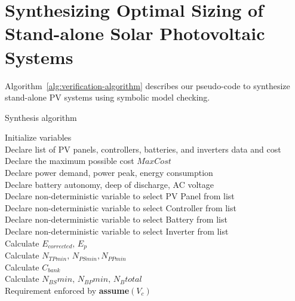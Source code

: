 \documentclass[10pt,conference]{IEEEtran}
\begin{document}
\section{Synthesizing Optimal Sizing of Stand-alone Solar Photovoltaic Systems}
Algorithm~\ref{alg:verification-algorithm} describes our pseudo-code to synthesize stand-alone PV systems using symbolic model checking. 
%
 \begin{algorithm}
 \caption{Synthesis algorithm}
 \begin{algorithmic}[1]
 \begin{scriptsize}
 \renewcommand{\algorithmicrequire}{\textbf{Input:}}
 \renewcommand{\algorithmicensure}{\textbf{Output:}}
  \STATE Initialize variables \\
  \STATE Declare list of PV panels, controllers, batteries, and inverters data and cost \\
  \STATE Declare the maximum possible cost $MaxCost$  \\
  \STATE Declare power demand, power peak, energy consumption \\
  \STATE Declare battery autonomy, deep of discharge, AC voltage \\
 	\STATE Declare non-deterministic variable to select PV Panel from list \\
 	\STATE Declare non-deterministic variable to select Controller from list \\
 	\STATE Declare non-deterministic variable to select Battery from list \\
 	\STATE Declare non-deterministic variable to select Inverter from list \\ 	
 	\STATE Calculate $E_{corrected}, \, E_{p} $ \\
	\STATE Calculate $N_{TPmin}, \, N_{PSmin}, N_{PPmin} $ \\
 	\STATE Calculate $C_{bank}$ \\
	\STATE Calculate $N_{BS}min, \, N_{BP}min, \, N_{B}total$ \\
	\STATE Requirement enforced by \textbf{assume}$(V_{c})$ \\

\end{scriptsize}
\end{algorithmic}
\end{algorithm}
\end{document}

